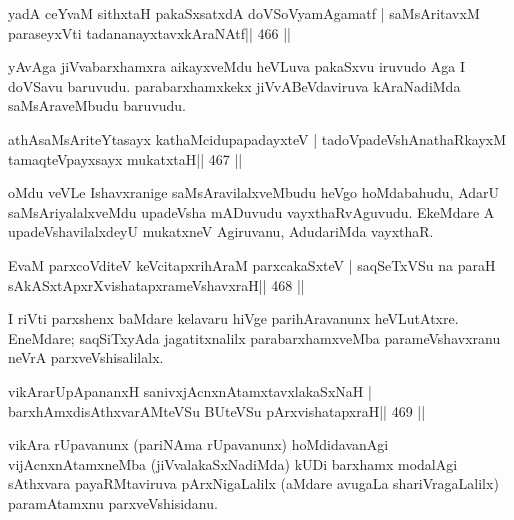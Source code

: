 \begin{shl}
yadA ceYvaM sithxtaH pakaSxsatxdA doVSoV\s yamAgamatf |
saMsAritavxM paraseyxVti tadananayxtavxkAraNAtf\hfill || 466 ||
\end{shl}

\begin{artha}
yAvAga jiVvabarxhamxra aikayxveMdu heVLuva pakaSxvu iruvudo Aga I
doVSavu baruvudu. parabarxhamxkekx jiVvABeVdaviruva kAraNadiMda
saMsAraveMbudu baruvudu.
\end{artha}

\begin{shl}
athAsaMsAriteYtasayx kathaMcidupapadayxteV |
tadoVpadeVshAnathaRkayxM tamaqteV\s payxsayx mukatxtaH\hfill || 467 ||
\end{shl}

\begin{artha}
oMdu veVLe Ishavxranige saMsAravilalxveMbudu heVgo hoMdabahudu, AdarU saMsAriyalalxveMdu upadeVsha mADuvudu vayxthaRvAguvudu. EkeMdare A upadeVshavilalxdeyU mukatxneV Agiruvanu, AdudariMda vayxthaR.
\end{artha}




\begin{shl}
EvaM parxcoVditeV keVcitapxrihAraM parxcakaSxteV |
saqSeTxVSu na paraH sAkASxtApxrXvishatapxrameVshavxraH\hfill || 468 ||
\end{shl}

\begin{artha}
I riVti parxshenx baMdare kelavaru hiVge parihAravanunx heVLutAtxre. EneMdare; saqSiTxyAda jagatitxnalilx parabarxhamxveMba parameVshavxranu neVrA parxveVshisalilalx.
\end{artha}


\begin{shl}
vikArarUpApananxH sanivxjAcnxnAtamxtavxlakaSxNaH |
barxhAmxdisAthxvarAMteVSu BUteVSu pArxvishatapxraH\hfill || 469 ||
\end{shl}

\begin{artha}
vikAra rUpavanunx (pariNAma rUpavanunx) hoMdidavanAgi vijAcnxnAtamxneMba (jiVvalakaSxNadiMda) kUDi barxhamx modalAgi sAthxvara payaRMtaviruva pArxNigaLalilx (aMdare avugaLa shariVragaLalilx) paramAtamxnu parxveVshisidanu.
\end{artha}

